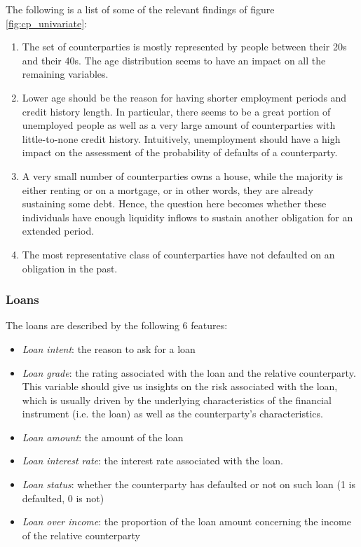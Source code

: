\documentclass[a4paper,12pt]{article}
\begin{document}
    The following is a list of some of the relevant findings of figure \ref{fig:cp_univariate}:

        \begin{enumerate} 
            \item The set of counterparties is mostly represented by people between their 20s and their 40s. The age distribution seems to have an impact on all the remaining variables. 
            \item Lower age should be the reason for having shorter employment periods and credit history length. In particular, there seems to be a great portion of unemployed people as well as a very large amount of counterparties with little-to-none credit history. Intuitively, unemployment should have a high impact on the assessment of the probability of defaults of a counterparty.  
            \item A very small number of counterparties owns a house, while the majority is either renting or on a mortgage, or in other words, they are already sustaining some debt. Hence, the question here becomes whether these individuals have enough liquidity inflows to sustain another obligation for an extended period. 
            \item The most representative class of counterparties have not defaulted on an obligation in the past. 
        \end{enumerate}

    \subsubsection*{Loans}
    The loans are described by the following 6 features:

    \begin{itemize}
        \item \textit{Loan intent}: the reason to ask for a loan
        \item \textit{Loan grade}: the rating associated with the loan and the relative counterparty. This variable should give us insights on the risk associated with the loan, which is usually driven by the underlying characteristics of the financial instrument (i.e. the loan) as well as the counterparty's characteristics.
        \item \textit{Loan amount}: the amount of the loan
        \item \textit{Loan interest rate}: the interest rate associated with the loan.
        \item \textit{Loan status}: whether the counterparty has defaulted or not on such loan (1 is defaulted, 0 is not) 
        \item \textit{Loan over income}:  the proportion of the loan amount concerning the income of the relative counterparty 
    \end{itemize}
\end{document}
